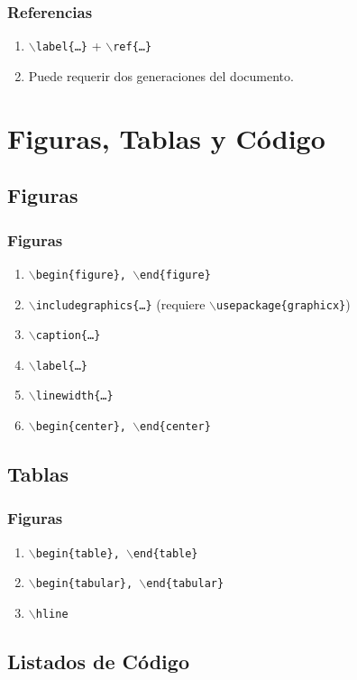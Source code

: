 \documentclass[a4paper,slidestop,xcolor=pst,dvips,blue]{beamer}
\newcommand{\command}[1]{\texttt{$\backslash$#1\{\dots\}}}
\newcommand{\singleCommand}[1]{\texttt{$\backslash$#1}}
\newcommand{\envCommand}[1]{\texttt{$\backslash$begin\{#1\}, $\backslash$end\{#1\}}}
\begin{document}
\begin{frame}[c]
    \frametitle{Referencias}
    \begin{enumerate}
        \item \command{label} + \command{ref}
        \item Puede requerir dos generaciones del documento. 
    \end{enumerate}
\end{frame}

\section{Figuras, Tablas y Código}

\subsection{Figuras}

\begin{frame}[c]
    \frametitle{Figuras}
    \begin{enumerate}[<+->]
        \item \envCommand{figure} 
        \item \command{includegraphics} (requiere \texttt{$\backslash$usepackage\{graphicx\}})
        \item \command{caption}
        \item \command{label}
        \item \command{linewidth}
        \item \envCommand{center} 
    \end{enumerate}
\end{frame}

\subsection{Tablas}

\begin{frame}[c]
    \frametitle{Figuras}
    \begin{enumerate}[<+->]
        \item \envCommand{table}
        \item \envCommand{tabular}
        \item \singleCommand{hline}
    \end{enumerate}
\end{frame}

\subsection{Listados de Código}
\end{document}
